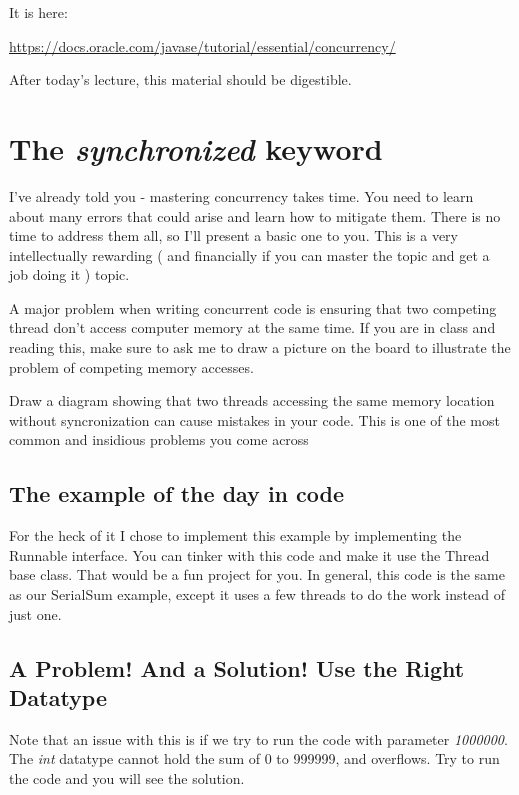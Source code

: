 \documentclass[12pt]{article}
\begin{document}
It is here:

\url{https://docs.oracle.com/javase/tutorial/essential/concurrency/}

After today's lecture, this material should be digestible.

\section{The \textit{synchronized} keyword}

I've already told you - mastering concurrency takes time. You need to learn
about many errors that could arise and learn how to mitigate them. There is no
time to address them all, so I'll present a basic one to you. This is a very
intellectually rewarding ( and financially if you can master the topic and get a
job doing it ) topic.


A major problem when writing concurrent code is ensuring that two competing
thread don't access computer memory at the same time. If you are in class and
reading this, make sure to ask me to draw a picture on the board to illustrate
the problem of competing memory accesses.

{\LARGE Draw a diagram showing that two threads accessing the same memory
location without syncronization can cause mistakes in your code. This is one of
the most common and insidious problems you come across}

\subsection{The example of the day in code}

For the heck of it I chose to implement this example by implementing the
Runnable interface. You can tinker with this code and make it use the Thread
base class. That would be a fun project for you. In general, this code is the
same as our SerialSum example, except it uses a few threads to do the work
instead of just one.



\subsection{A Problem! And a Solution! Use the Right Datatype}
Note that an issue with this is if we try to run the code with parameter
\textit{1000000}. The \textit{int} datatype cannot hold the sum of 0 to 999999,
and overflows. Try to run the code and you will see the solution.
\end{document}

